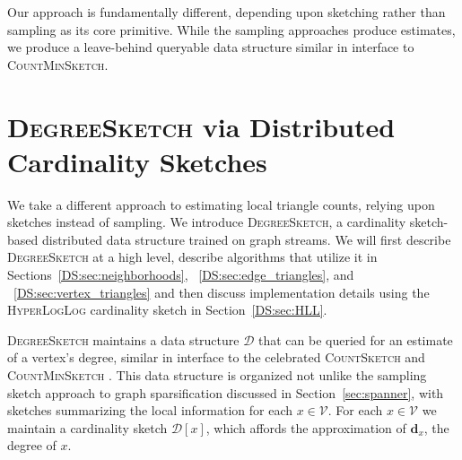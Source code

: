 \documentclass[10]{article}
\newcommand{\algoname}[1]{\textnormal{\textsc{#1}}}
\begin{document}
Our approach is fundamentally different, depending upon sketching rather than sampling as its core primitive. 
While the sampling approaches produce estimates, we produce a leave-behind queryable data structure similar in interface to \algoname{CountMinSketch}.


\section{\algoname{DegreeSketch} via Distributed Cardinality Sketches}
 \label{DS:sec:DS}

We take a different approach to estimating local triangle counts, relying upon sketches instead of sampling.
We introduce \algoname{DegreeSketch}, a cardinality sketch-based distributed data structure trained on graph streams.
We will first describe \algoname{DegreeSketch} at a high level, describe algorithms that utilize it in Sections~\ref{DS:sec:neighborhoods}, ~\ref{DS:sec:edge_triangles}, and ~\ref{DS:sec:vertex_triangles} and then discuss implementation details using the \algoname{HyperLogLog} cardinality sketch in Section~\ref{DS:sec:HLL}.

\algoname{DegreeSketch} maintains a data structure $\mathcal{D}$ that can be queried for an estimate of a vertex's degree, similar in interface to the celebrated \algoname{CountSketch} \cite{charikar2002finding} and \algoname{CountMinSketch} \cite{cormode2005improved}.
This data structure is organized not unlike the sampling sketch approach to graph sparsification discussed in Section~\ref{sec:spanner}, with sketches summarizing the local information for each $x \in \mathcal{V}$.
For each $x \in \mathcal{V}$ we maintain a cardinality sketch $\mathcal{D}[x]$, which affords the approximation of $\mathbf{d}_x$, the degree of $x$. 
\end{document}
